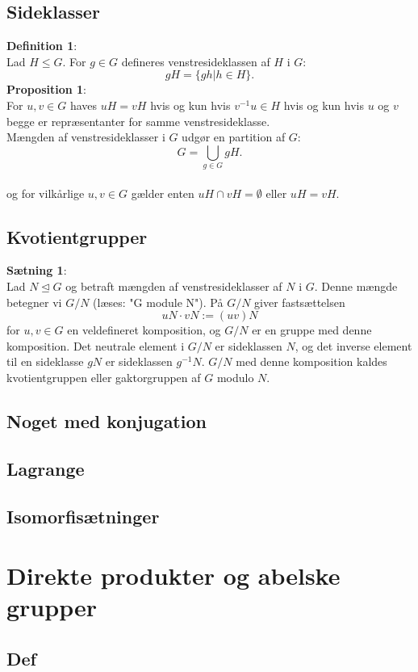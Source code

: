 \documentclass[11pt]{article}
\begin{document}
\subsection*{Sideklasser}
\textbf{Definition 1}:\\
Lad $H \leq G$. For $g \in G$ defineres venstresideklassen af $H$ i $G$:\\
$$gH = \{ gh | h \in H \}.$$
\textbf{Proposition 1}:\\
For $u, v \in G$ haves $uH = vH$ hvis og kun hvis $v^{-1} u \in H$ hvis og kun hvis $u$ og $v$ begge er repræsentanter for samme venstresideklasse.\\
Mængden af venstresideklasser i $G$ udgør en partition af $G$:\\
$$G = \bigcup_{g \in G} gH.$$\\
og for vilkårlige $u, v \in G$ gælder enten $uH \cap vH = \emptyset$ eller $uH = vH$.
\subsection*{Kvotientgrupper}
\textbf{Sætning 1}:\\
Lad $N \trianglelefteq G$ og betraft mængden af venstresideklasser af $N$ i $G$. Denne mængde betegner vi $G / N$ (læses: "G module N"). På $G / N$ giver fastsættelsen
$$uN \cdot vN := (uv)N$$
for $u, v \in G$ en veldefineret komposition, og $G / N$ er en gruppe med denne komposition. Det neutrale element i $G / N$ er sideklassen $N$, og det inverse element til en sideklasse $gN$ er sideklassen $g^{-1} N$. $G / N$ med denne komposition kaldes kvotientgruppen eller gaktorgruppen af $G$ modulo $N$.\\

\subsection*{Noget med konjugation}
\subsection*{Lagrange}
\subsection*{Isomorfisætninger}

\section*{Direkte produkter og abelske grupper}
\subsection*{Def}
\end{document}
